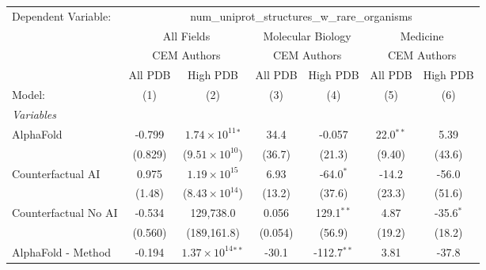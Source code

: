 \begingroup
\centering
\begin{tabular}{lcccccc}
   \tabularnewline \midrule \midrule
   Dependent Variable: & \multicolumn{6}{c}{num\_uniprot\_structures\_w\_rare\_organisms}\\
 & \multicolumn{2}{c}{All Fields} & \multicolumn{2}{c}{Molecular Biology} & \multicolumn{2}{c}{Medicine} \\
\cmidrule(lr){2-3} \cmidrule(lr){4-5} \cmidrule(lr){6-7}
 & \multicolumn{2}{c}{CEM Authors} & \multicolumn{2}{c}{CEM Authors} & \multicolumn{2}{c}{CEM Authors} \\
\cmidrule(lr){2-3} \cmidrule(lr){4-5} \cmidrule(lr){6-7}
 & \multicolumn{1}{c}{All PDB} & \multicolumn{1}{c}{High PDB} & \multicolumn{1}{c}{All PDB} & \multicolumn{1}{c}{High PDB} & \multicolumn{1}{c}{All PDB} & \multicolumn{1}{c}{High PDB} \\
\cmidrule(lr){2-2} \cmidrule(lr){3-3} \cmidrule(lr){4-4} \cmidrule(lr){5-5} \cmidrule(lr){6-6} \cmidrule(lr){7-7}
   Model:                                                     & (1)          & (2)                            & (3)     & (4)           & (5)          & (6)\\  
   \midrule
   \emph{Variables}\\
   AlphaFold                                                  & -0.799       & $1.74\times 10^{11}$$^{*}$     & 34.4    & -0.057        & 22.0$^{**}$  & 5.39\\   
                                                              & (0.829)      & ($9.51\times 10^{10}$)         & (36.7)  & (21.3)        & (9.40)       & (43.6)\\   
   Counterfactual AI                                          & 0.975        & $1.19\times 10^{15}$           & 6.93    & -64.0$^{*}$   & -14.2        & -56.0\\   
                                                              & (1.48)       & ($8.43\times 10^{14}$)         & (13.2)  & (37.6)        & (23.3)       & (51.6)\\   
   Counterfactual No AI                                       & -0.534       & 129,738.0                      & 0.056   & 129.1$^{**}$  & 4.87         & -35.6$^{*}$\\   
                                                              & (0.560)      & (189,161.8)                    & (0.054) & (56.9)        & (19.2)       & (18.2)\\   
   AlphaFold - Method                                         & -0.194       & $1.37\times 10^{14}$$^{**}$    & -30.1   & -112.7$^{**}$ & 3.81         & -37.8\\   

\end{tabular}
